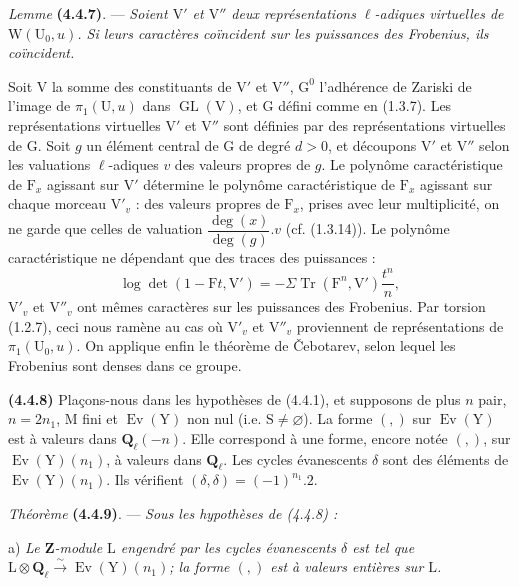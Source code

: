 \documentclass[11pt,leqno]{article}
\begin{document}
\textit{Lemme} \textbf{(4.4.7)}. — \textit{Soient \(\mathrm{V}'\) et \(\mathrm{V}''\) deux représentations \(\ell\)-adiques virtuelles de \(\mathrm{W}(\mathrm{U}_0,u)\). Si leurs caractères coïncident sur les puissances des Frobenius, ils coïncident.}

Soit \(\mathrm{V}\) la somme des constituants de \(\mathrm{V}'\) et \(\mathrm{V}''\), \(\mathrm{G}^0\) l’adhérence de Zariski de l’image de \(\pi_1(\mathrm{U},u)\) dans \(\operatorname{GL}(\mathrm{V})\), et \(\mathrm{G}\) défini comme en (1.3.7). Les représentations virtuelles \(\mathrm{V}'\) et \(\mathrm{V}''\) sont définies par des représentations virtuelles de \(\mathrm{G}\). Soit \(g\) un élément central de \(\mathrm{G}\) de degré \(d>0\), et découpons \(\mathrm{V}'\) et \(\mathrm{V}''\) selon les valuations \(\ell\)-adiques \(v\) des valeurs propres de \(g\). Le polynôme caractéristique de \(\mathrm{F}_x\) agissant sur \(\mathrm{V}'\) détermine le polynôme caractéristique de \(\mathrm{F}_x\) agissant sur chaque morceau \(\mathrm{V}'_v\) : des valeurs propres de \(\mathrm{F}_x\), prises avec leur multiplicité, on ne garde que celles de valuation \(\dfrac{\deg(x)}{\deg(g)}.v\) (cf. (1.3.14)). Le polynôme caractéristique ne dépendant que des traces des puissances :
\[
\log\det(1-\mathrm{F}t,\mathrm{V}')
=-\Sigma\operatorname{Tr}(\mathrm{F}^n,\mathrm{V}')\frac{t^n}{n},
\]
\(\mathrm{V}'_v\) et \(\mathrm{V}''_v\) ont mêmes caractères sur les puissances des Frobenius. Par torsion (1.2.7), ceci nous ramène au cas où \(\mathrm{V}'_v\) et \(\mathrm{V}''_v\) proviennent de représentations de \(\pi_1(\mathrm{U}_0,u)\). On applique enfin le théorème de \v{C}ebotarev, selon lequel les Frobenius sont denses dans ce groupe.

\textbf{(4.4.8)} Plaçons-nous dans les hypothèses de (4.4.1), et supposons de plus \(n\) pair, \(n=2n_1\), \(\mathrm{M}\) fini et \(\operatorname{Ev}(\mathrm{Y})\) non nul (i.e. \(\mathrm{S}\neq\varnothing\)). La forme \((,)\) sur \(\operatorname{Ev}(\mathrm{Y})\) est à valeurs dans \(\mathbf{Q}_\ell(-n)\). Elle correspond à une forme, encore notée \((,)\), sur \(\operatorname{Ev}(\mathrm{Y})(n_1)\), à valeurs dans \(\mathbf{Q}_\ell\). Les cycles évanescents \(\delta\) sont des éléments de \(\operatorname{Ev}(\mathrm{Y})(n_1)\). Ils vérifient \((\delta,\delta)=(-1)^{n_1}.2\).

\textit{Théorème} \textbf{(4.4.9)}. — \textit{Sous les hypothèses de \textup{(4.4.8)} :}

a) \textit{Le \(\mathbf{Z}\)-module \(\mathrm{L}\) engendré par les cycles évanescents \(\delta\) est tel que \(\mathrm{L}\otimes\mathbf{Q}_\ell\xrightarrow{\sim}\operatorname{Ev}(\mathrm{Y})(n_1)\); la forme \((,)\) est à valeurs entières sur \(\mathrm{L}\).}
\end{document}
